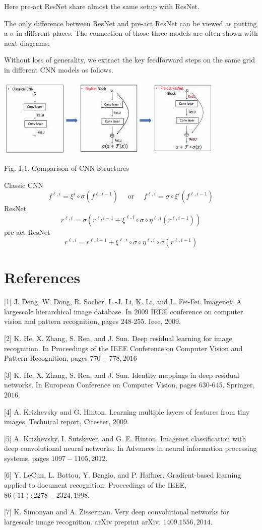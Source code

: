 \documentclass[10pt]{article}
\begin{document}
Here pre-act ResNet share almost the same setup with ResNet.

The only difference between ResNet and pre-act ResNet can be viewed as putting a $\sigma$ in different places. The connection of those three models are often shown with next diagrams:

Without loss of generality, we extract the key feedforward steps on the same grid in different CNN models as follows.

\includegraphics[max width=\textwidth]{2022_01_06_73aade67e8906ae5893fg-6}

Fig. 1.1. Comparison of CNN Structures

Classic CNN
$$
f^{\ell, i}=\xi^{i} \circ \sigma\left(f^{\ell, i-1}\right) \quad \text { or } \quad f^{\ell, i}=\sigma \circ \xi^{i}\left(f^{\ell, i-1}\right)
$$
ResNet
$$
r^{\ell, i}=\sigma\left(r^{\ell, i-1}+\xi^{\ell, i} \circ \sigma \circ \eta^{\ell, i}\left(r^{\ell, i-1}\right)\right)
$$
pre-act ResNet
$$
r^{\ell, i}=r^{\ell, i-1}+\xi^{\ell, i} \circ \sigma \circ \eta^{\ell, i} \circ \sigma\left(r^{\ell, i-1}\right)
$$

\section{References}
[1] J. Deng, W. Dong, R. Socher, L.-J. Li, K. Li, and L. Fei-Fei. Imagenet: A largescale hierarchical image database. In 2009 IEEE conference on computer vision and pattern recognition, pages 248-255. Ieee, 2009.

[2] K. He, X. Zhang, S. Ren, and J. Sun. Deep residual learning for image recognition. In Proceedings of the IEEE Conference on Computer Vision and Pattern Recognition, pages $770-778,2016$

[3] K. He, X. Zhang, S. Ren, and J. Sun. Identity mappings in deep residual networks. In European Conference on Computer Vision, pages 630-645. Springer, $2016 .$

[4] A. Krizhevsky and G. Hinton. Learning multiple layers of features from tiny images. Technical report, Citeseer, $2009 .$

[5] A. Krizhevsky, I. Sutskever, and G. E. Hinton. Imagenet classification with deep convolutional neural networks. In Advances in neural information processing systems, pages $1097-1105,2012$.

[6] Y. LeCun, L. Bottou, Y. Bengio, and P. Haffner. Gradient-based learning applied to document recognition. Proceedings of the IEEE, $86(11): 2278-2324,1998 .$

[7] K. Simonyan and A. Zisserman. Very deep convolutional networks for largescale image recognition. arXiv preprint arXiv: $1409.1556,2014 .$
\end{document}
